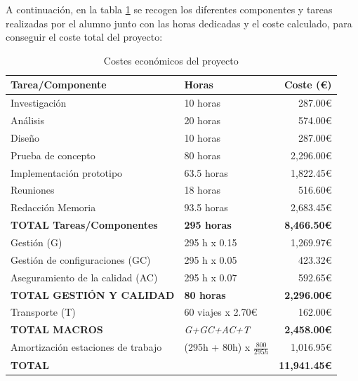 A continuación, en la tabla \ref{tab:costeproyecto} se recogen los diferentes componentes y tareas realizadas por el alumno junto con las horas dedicadas y el coste calculado, para conseguir el coste total del proyecto: 


\begin{table}[H]
\centering
\bgroup
\def\arraystretch{1.3}
\begin{tabular}{l p{120pt} r}
\toprule
\textbf{Tarea/Componente} & \textbf{Horas} & \textbf{Coste (€)} \\
 \midrule
 Investigación
& 
10 horas
& 
287.00€
 \\
 Análisis
& 
20 horas
& 
574.00€
 \\
 Diseño
& 
10 horas
& 
287.00€
 \\
 Prueba de concepto
& 
80 horas
& 
2,296.00€
 \\
 Implementación prototipo
& 
63.5 horas
&
1,822.45€
 \\
 Reuniones
& 
18 horas
& 
516.60€
 \\
 Redacción Memoria
& 
93.5 horas
& 
2,683.45€
 \\
 \textbf{TOTAL Tareas/Componentes}
& 
\textbf{295 horas}
& 
\textbf{8,466.50€}
 \\
 \hline
 Gestión (G)
& 
295 h x 0.15
& 
1,269.97€
 \\
 Gestión de configuraciones (GC)
& 
295 h x 0.05
& 
423.32€
 \\
 Aseguramiento de la calidad (AC)
& 
295 h x 0.07
& 
592.65€
 \\
 \textbf{TOTAL GESTIÓN Y CALIDAD}
& 
\textbf{80 horas}
& 
\textbf{2,296.00€}
 \\
 \hline
 Transporte (T)
& 
60 viajes x 2.70€
& 
162.00€
 \\
 \textbf{TOTAL MACROS}
& 
\textit{G+GC+AC+T}
& 
\textbf{2,458.00€}
 \\
 \hline
 Amortización estaciones de trabajo
& 
(295h + 80h) x \( \frac{800}{295 h} \)
& 
1,016.95€
 \\
 \textbf{TOTAL}
& 
& 
\textbf{11,941.45€}
 \\
\bottomrule
\end{tabular}
\egroup
\caption{Costes económicos del proyecto}
\label{tab:costeproyecto}
\end{table}
 